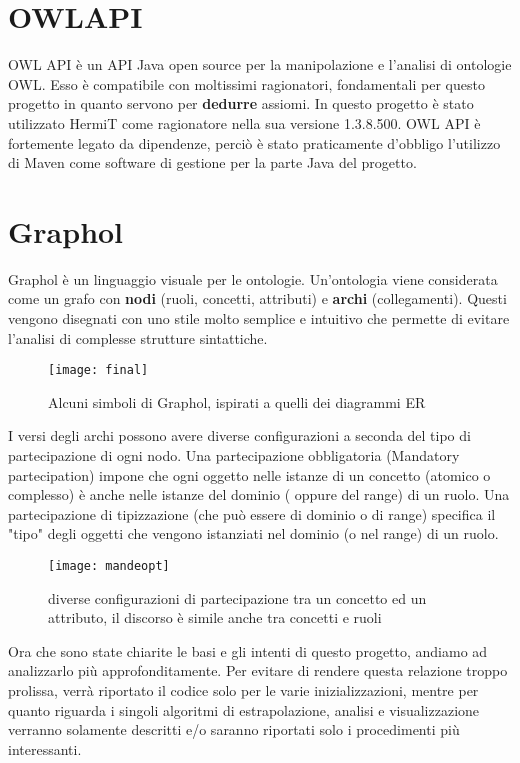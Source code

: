 \documentclass[Lau,binding=0.6cm]{sapthesis}
\begin{document}
\section{OWLAPI}
OWL API è un API Java open source per la manipolazione e l'analisi di ontologie OWL. Esso è compatibile con moltissimi ragionatori, fondamentali per questo progetto in quanto servono per \textbf{dedurre} assiomi. In questo progetto è stato utilizzato HermiT come ragionatore nella sua versione 1.3.8.500. OWL API è fortemente legato da dipendenze, perciò è stato praticamente d'obbligo l'utilizzo di Maven come software di gestione per la parte Java del progetto. 

\section{Graphol}
Graphol è un linguaggio visuale per le ontologie. Un'ontologia viene considerata come un grafo con \textbf{nodi} (ruoli, concetti, attributi) e \textbf{archi} (collegamenti). Questi vengono disegnati con uno stile molto semplice e intuitivo che permette di evitare l'analisi di complesse strutture sintattiche.

\begin{figure}[H]
\centering
\texttt{[image: final]}\\[3ex]
\caption{Alcuni simboli di Graphol, ispirati a quelli dei diagrammi ER}
\label{fig:largenenough}
\end{figure}
I versi degli archi possono avere diverse configurazioni a seconda del tipo di partecipazione di ogni nodo.
Una partecipazione obbligatoria (Mandatory partecipation) impone che ogni oggetto nelle istanze di un concetto (atomico o complesso) è anche nelle istanze del dominio ( oppure del range) di un ruolo. Una partecipazione di tipizzazione (che può essere di dominio o di range) specifica il "tipo" degli oggetti che vengono istanziati nel dominio (o nel range) di un ruolo.
\begin{figure}[H]
\centering
\texttt{[image: mandeopt]}\\[3ex]
\caption{diverse configurazioni di partecipazione tra un concetto ed un attributo, il discorso è simile anche tra concetti e ruoli}
\label{fig:largenenough}
\end{figure}
Ora che sono state chiarite le basi e gli intenti di questo progetto, andiamo ad analizzarlo più approfonditamente. Per evitare di rendere questa relazione troppo prolissa, verrà riportato il codice solo per le varie inizializzazioni, mentre per quanto riguarda i singoli algoritmi di estrapolazione, analisi e visualizzazione verranno solamente descritti e/o saranno riportati solo i procedimenti più interessanti.
\end{document}
